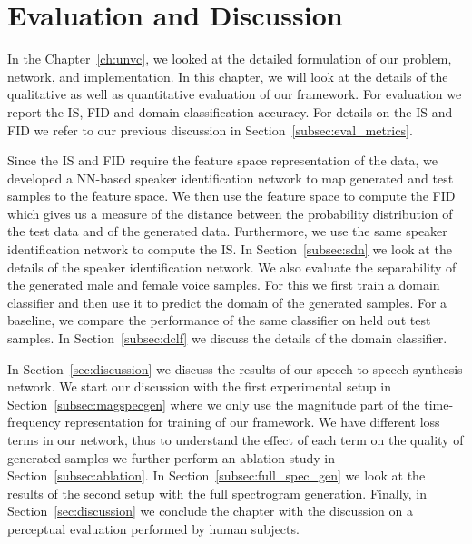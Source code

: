 \chapter{Evaluation and Discussion}
\label{ch:results}
In the Chapter~\ref{ch:unvc}, we looked at the detailed formulation of our problem, network, and implementation. In this chapter, we will look at the details of the qualitative as well as quantitative evaluation of our framework. For evaluation we report the IS, FID and domain classification accuracy. For details on the IS and FID we refer to our previous discussion in Section~\ref{subsec:eval_metrics}.

Since the IS and FID require the feature space representation of the data, we developed a NN-based speaker identification network to map generated and test samples to the feature space. We then use the feature space to compute the FID which gives us a measure of the distance between the probability distribution of the test data and of the generated data. Furthermore, we use the same speaker identification network to compute the IS. In Section~\ref{subsec:sdn} we look at the details of the speaker identification network. We also evaluate the separability of the generated male and female voice samples. For this we first train a domain classifier and then use it to predict the domain of the generated samples. For a baseline, we compare the performance of the same classifier on held out test samples. In Section~\ref{subsec:dclf} we discuss the details of the domain classifier. 

In Section~\ref{sec:discussion} we discuss the results of our speech-to-speech synthesis network. We start our discussion with the first experimental setup in Section~\ref{subsec:magspecgen} where we only use the magnitude part of the time-frequency representation for training of our framework.
We have different loss terms in our network, thus to understand the effect of each term on the quality of generated samples we further perform an ablation study in Section~\ref{subsec:ablation}. In Section~\ref{subsec:full_spec_gen} we look at the results of the second setup with the full spectrogram generation. Finally, in Section~\ref{sec:discussion} we conclude the chapter with the discussion on a perceptual evaluation performed by human subjects.




